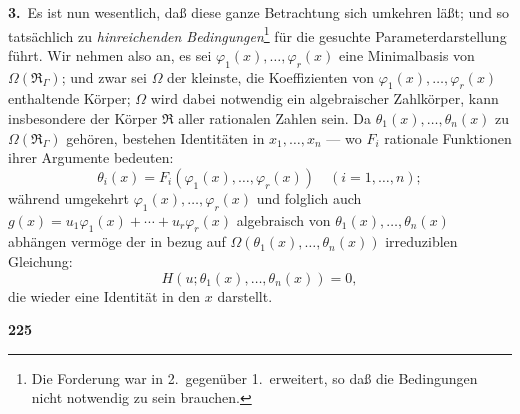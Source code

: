 \documentclass[12pt,a4paper]{article}
\begin{document}
\textbf{3.}\ Es ist nun wesentlich, da\ss{} diese ganze Betrachtung sich umkehren l\"a\ss t; und so tats\"achlich zu \emph{hinreichenden Bedingungen}\footnote{Die Forderung war in 2.\ gegen\"uber 1.\ erweitert, so da\ss{} die Bedingungen nicht notwendig zu sein brauchen.} f\"ur die gesuchte Parameterdarstellung f\"uhrt. Wir nehmen also an, es sei $\varphi_1(x), \ldots, \varphi_r(x)$ eine Minimalbasis von $\Omega(\mathfrak{R}_{\Gamma})$; und zwar sei $\Omega$ der kleinste, die Koeffizienten von $\varphi_1(x), \ldots, \varphi_r(x)$ enthaltende K\"orper; $\Omega$ wird dabei notwendig ein algebraischer Zahlk\"orper, kann insbesondere der K\"orper $\mathfrak{R}$ aller rationalen Zahlen sein. Da $\theta_1(x), \ldots, \theta_n(x)$ zu $\Omega(\mathfrak{R}_{\Gamma})$ geh\"oren, bestehen Identit\"aten in $x_1, \ldots, x_n$ --- wo $F_i$ rationale Funktionen ihrer Argumente bedeuten:
\begin{equation}\tag{5}
\theta_i(x) = F_i(\varphi_1(x), \ldots, \varphi_r(x)) \quad (i = 1, \ldots, n);
\end{equation}
w\"ahrend umgekehrt $\varphi_1(x), \ldots, \varphi_r(x)$ und folglich auch $g(x) = u_1 \varphi_1(x) + \cdots + u_r \varphi_r(x)$ algebraisch von $\theta_1(x), \ldots, \theta_n(x)$ abh\"angen verm\"oge der in bezug auf $\Omega(\theta_1(x), \ldots, \theta_n(x))$ irreduziblen Gleichung:
\begin{equation}\tag{6}
H(u; \theta_1(x), \ldots, \theta_n(x)) = 0,
\end{equation}
die wieder eine Identit\"at in den $x$ darstellt.

\newpage
\begin{center}
\textbf{225}
\end{center}
\end{document}
